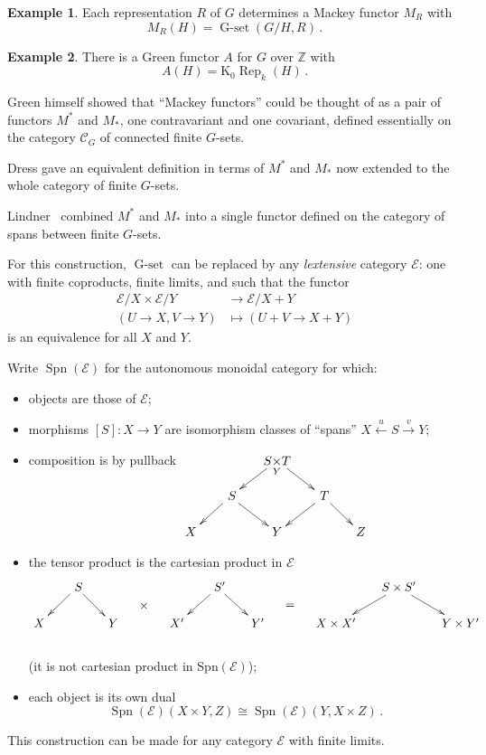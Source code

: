 \documentclass[a4paper,12pt]{article}
\makeatletter
\theoremstyle{definition}
\newtheorem{example}{Example}[subsection]
\theoremstyle{fact}
\theoremstyle{genquest}
\theoremstyle{step}
\newcommand{\catC}{\mathcal{C}}
\newcommand{\catE}{\mathcal{E}}
\newcommand{\GSet}{\operatorname{G-set}}
\newcommand{\ringK}{\mathrm{K}}
\newcommand{\Rep}{\operatorname{Rep}}
\newcommand{\Spn}{\operatorname{Spn}}
\newcommand{\ZZ}{\mathbb{Z}}
\newcommand{\longto}{\longrightarrow}
\newcommand{\longfrom}{\longleftarrow}
\newcommand{\xylongto}[2][2pt]{{\UseTips{}\xymatrix @C+#1{ \ar[r]^{#2}&}}}
\makeatother
\begin{document}
\begin{example} 
Each representation $R$ of $G$ determines a Mackey functor $M_R$ with
 \[
 M_R (H) = \GSet(G/H,R) \,.
 \]
\end{example} 
 
\begin{example} 
There is a Green functor $A$ for $G$ over $\ZZ $ with
\[
A(H) = \ringK_0 \Rep_k (H) \,.
\]
\end{example} 

Green himself showed that ``Mackey functors'' could be thought of as a pair of functors $M^\ast$ and $M_\ast$, one contravariant and one covariant, defined essentially on the category $\catC_G$ of connected finite $G$-sets.
 
Dress gave an equivalent definition in terms of $M^\ast$ and $M_\ast$ now extended to the whole category of finite $G$-sets.

Lindner~\cite{Lindner1976} combined $M^\ast$ and $M_\ast$ into a single functor defined on the category of spans between finite $G$-sets.

\noindent
For this construction, $\GSet$ can be replaced by any \emph{lextensive} category $\catE$: 
one with finite coproducts, finite limits, and such that the functor
%
\begin{align*}
\catE/X \times \catE/Y &\longto \catE/X + Y
\\
(U\to X, V \to Y) &\longmapsto (U+V \to X+Y)
\end{align*}
is an equivalence for all $X$ and $Y$.


Write $\Spn (\catE)$ for the autonomous monoidal category for which:
\begin{itemize}
\item 
 objects are those of $\catE$;
\item
 morphisms $[S] : X  \longto %
  Y$ are isomorphism classes of ``spans'' $X \stackrel{u}{ \longfrom} S \stackrel{v}{ \longto} Y$; 
\item
composition is by pullback
$ \xymatrix @C-3mm @R-3mm {
 & & *+{S \smash{\operatorname*{\times}\limits_{Y}} T} \ar[ld]  \ar[rd] & & \\
 & \ar[ld] \ S \ar[rd] & & \ar[ld] \,T \ar[rd] & \\
 X & & Y & & Z}$
%
\item
the tensor product is the cartesian product in $\catE$
\[
\xymatrix @C-3mm @R-3mm{ 
 & \ar[ld] \ S \ar[rd]&&&& \ S' \ar[ld]  \ar[rd] &&&& S\times S' \ar[ld] \ar[rd]\\
X && Y & \ar@{}[u]|{\mbox{$\times$}} & X' && Y'  & \ar@{}[u]|{\mbox{$=$}}&  X \times X' &  & Y \times Y'}  
\]
\\
(it is not cartesian product in Spn$(\catE)$); 
\item
each object is its own dual
\[
\Spn  (\catE) (X\times Y, Z) \cong \Spn  (\catE) (Y,X \times Z)\,.
\]
\end{itemize}
This construction can be made for any category $\catE$ with finite limits.
\end{document}
